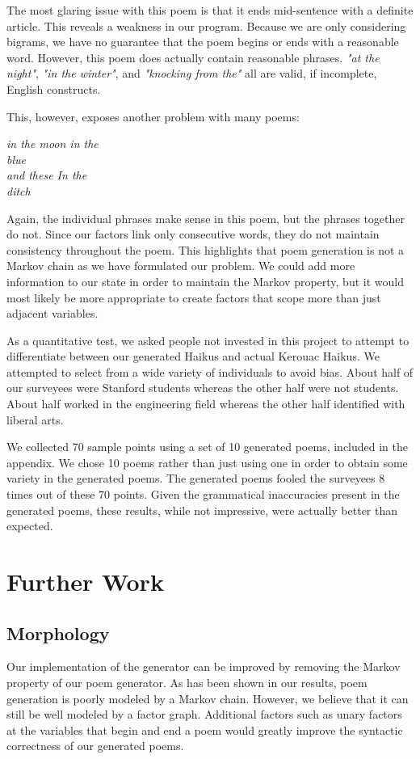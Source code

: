\documentclass[journal]{IEEEtran}
\begin{document}
The most glaring issue with this poem is that it ends mid-sentence with a definite article. This reveals a weakness in our program. Because we are only considering bigrams, we have no guarantee that the poem begins or ends with a reasonable word. However, this poem does actually contain reasonable phrases. \textit{"at the night"}, \textit{"in the winter"}, and \textit{"knocking from the"} all are valid, if incomplete, English constructs. 

This, however, exposes another problem with many poems:
\begin{center}
    \textit{
    in the moon in the\\
    blue\\
    and these In the\\
    ditch\\
}
\end{center}

Again, the individual phrases make sense in this poem, but the phrases together do not. Since our factors link only consecutive words, they do not maintain consistency throughout the poem. This highlights that poem generation is not a Markov chain as we have formulated our problem. We could add more information to our state in order to maintain the Markov property, but it would most likely be more appropriate to create factors that scope more than just adjacent variables. 

As a quantitative test, we asked people not invested in this project to attempt to differentiate between our generated Haikus and actual Kerouac Haikus. We attempted to select from a wide variety of individuals to avoid bias. About half of our surveyees were Stanford students whereas the other half were not students. About half worked in the engineering field whereas the other half identified with liberal arts. 

We collected 70 sample points using a set of 10 generated poems, included in the appendix. We chose 10 poems rather than just using one in order to obtain some variety in the generated poems. The generated poems fooled the surveyees 8 times out of these 70 points. Given the grammatical inaccuracies present in the generated poems, these results, while not impressive, were actually better than expected.

\section{Further Work}
\subsection{Morphology}
Our implementation of the generator can be improved by removing the Markov property of our poem generator. As has been shown in our results, poem generation is poorly modeled by a Markov chain. However, we believe that it can still be well modeled by a factor graph. Additional factors such as unary factors at the variables that begin and end a poem would greatly improve the syntactic correctness of our generated poems.
\end{document}
